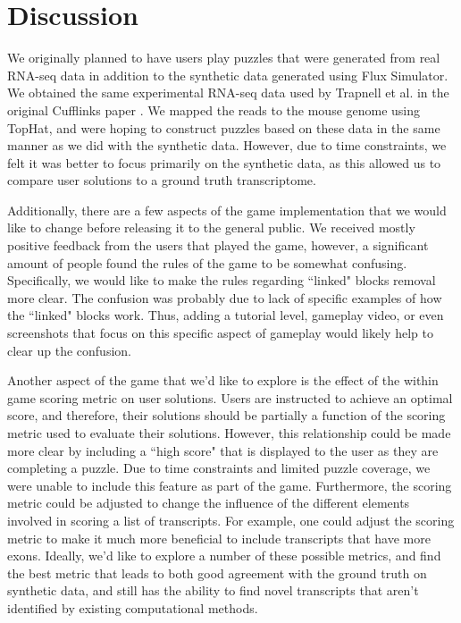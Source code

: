 \documentclass[12pt]{article}
\begin{document}
\section*{Discussion}

We originally planned to have users play puzzles that were generated from real RNA-seq data in addition to the synthetic data generated using Flux Simulator.
We obtained the same experimental RNA-seq data used by Trapnell et al. in the original Cufflinks paper \citep{trapnell2010transcript}. We mapped the reads to 
the mouse genome using TopHat, and were hoping to construct puzzles based on these data in the same manner as we did with the synthetic data. However, due
to time constraints, we felt it was better to focus primarily on the synthetic data, as this allowed us to compare user solutions to a ground truth transcriptome.

Additionally, there are a few aspects of the game implementation that we would like to change before releasing it to the general public. We received mostly
positive feedback from the users that played the game, however, a significant amount of people found the rules of the game to be somewhat confusing. Specifically,
we would like to make the rules regarding ``linked" blocks removal more clear. The confusion was probably due to lack of specific examples of how the ``linked" blocks
work. Thus, adding a tutorial level, gameplay video, or even screenshots that focus on this specific aspect of gameplay would likely help to clear up the confusion.

Another aspect of the game that we'd like to explore is the effect of the within game scoring metric on user solutions. Users are instructed to achieve an optimal score,
and therefore, their solutions should be partially a function of the scoring metric used to evaluate their solutions. However, this relationship could be made more clear by
including a ``high score" that is displayed to the user as they are completing a puzzle. Due to time constraints and limited puzzle coverage, we were unable to include this
feature as part of the game. Furthermore, the scoring metric could be adjusted to change the influence of the different elements involved in scoring a list of transcripts. For example,
one could adjust the scoring metric to make it much more beneficial to include transcripts that have more exons. Ideally, we'd like to explore a number of these possible
metrics, and find the best metric that leads to both good agreement with the ground truth on synthetic data, and still has the ability to find novel transcripts that aren't 
identified by existing computational methods.
\end{document}
